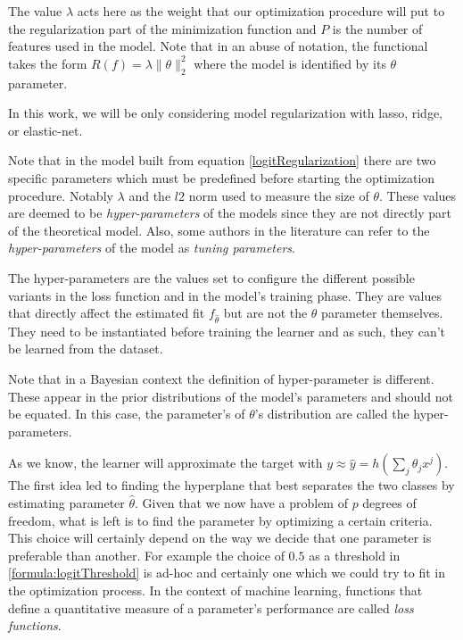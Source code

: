 
%


The value $\lambda$ acts here as the weight that our optimization procedure will put to the regularization part of the minimization function and $P$ is the number of features used in the model. Note that in an abuse of notation, the functional takes the form $R(f) = \lambda\| \theta\|_{2}^2$ where the model is identified by its $\theta$ parameter.

In this work, we will be only considering model regularization with lasso, ridge, or elastic-net.

Note that in the model built from equation \cref{logitRegularization} there are two specific parameters which must be predefined before starting the optimization procedure. Notably $\lambda$ and the $l2$ norm used to measure the size of $\theta$. These values are deemed to be \textit{hyper-parameters} of the models since they are not directly part of the theoretical model. Also, some authors in the literature can refer to the \textit{hyper-parameters} of the model as \textit{tuning parameters}.

The hyper-parameters are the values set to configure the different possible variants in the loss function and in the model's training phase. They are values that directly affect the estimated fit $f_{\hat{\theta}}$ but are not the $\theta$ parameter themselves. They need to be instantiated before training the learner and as such, they can't be learned from the dataset.

Note that in a Bayesian context the definition of hyper-parameter is different. These appear in the prior distributions of the model's parameters and should not be equated. In this case, the parameter's of $\theta$'s distribution are called the hyper-parameters.


\textit{}


As we know, the learner will approximate the target with $y \approx \hat{y} = h\left(\sum_{j}\theta_j x^j\right)$. The first idea led to finding the hyperplane that best separates the two classes by estimating parameter $\hat{\theta}$. Given that we now have a problem of $p$ degrees of freedom, what is left is to find the parameter by optimizing a certain criteria. This choice will certainly depend on the way we decide that one parameter is preferable than another. For example the choice of $0.5$ as a threshold in \cref{formula:logitThreshold} is ad-hoc and certainly one which we could try to fit in the optimization process. In the context of machine learning, functions that define a quantitative measure of a parameter's performance are called \textit{loss functions}.

